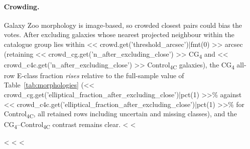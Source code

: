 \documentclass{aa}
\newcommand{\CC}{Control\textsubscript{4C}}
\newcommand{\CG}{CG\textsubscript{4}}
\begin{document}
\begin{appendix}
\paragraph{Crowding.} Galaxy Zoo morphology is image-based, so crowded closest pairs could bias the votes. After excluding galaxies whose nearest projected neighbour within the catalogue group lies within << crowd.get('threshold_arcsec')|fmt(0) >> arcsec (retaining << crowd_cg.get('n_after_excluding_close') >> \CG{} and << crowd_c4c.get('n_after_excluding_close') >> \CC{} galaxies), the \CG{} all-row E-class fraction \emph{rises} relative to the full-sample value of Table~\ref{tab:morphologies} (<< crowd_cg.get('elliptical_fraction_after_excluding_close')|pct(1) >>\% against << crowd_c4c.get('elliptical_fraction_after_excluding_close')|pct(1) >>\% for \CC{}, all retained rows including uncertain and missing classes), and the \CG{}--\CC{} contrast remains clear. <%
<%

<%
<%
<%

\end{appendix}
\end{document}
